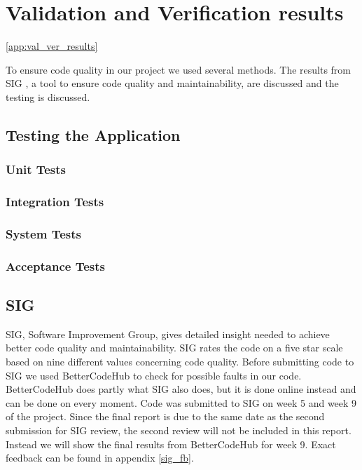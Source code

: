 \chapter{Validation and Verification results}\ref{app:val_ver_results}

To ensure code quality in our project we used several methods. The results from SIG \cite{sig}, a tool to ensure code quality and maintainability, are discussed and the testing is discussed.


\section{Testing the Application}

\subsection{Unit Tests}


\subsection{Integration Tests}

\subsection{System Tests}

\subsection{Acceptance Tests}

\section{SIG}
SIG, Software Improvement Group, gives detailed insight needed to achieve better code quality and maintainability. SIG rates the code on a five star scale based on nine different values concerning code quality. Before submitting code to SIG we used BetterCodeHub\cite{better_code_hub} to check for possible faults in our code. BetterCodeHub does partly what SIG also does, but it is done online instead and can be done on every moment. Code was submitted to SIG on week 5 and week 9 of the project. Since the final report is due to the same date as the second submission for SIG review, the second review will not be included in this report. Instead we will show the final results from BetterCodeHub for week 9. Exact feedback can be found in appendix \ref{sig_fb}.


